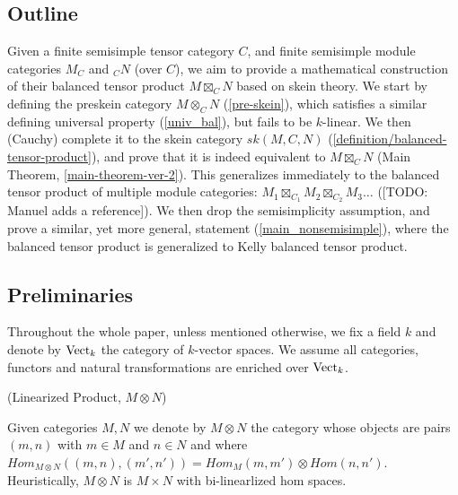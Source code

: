 
\subsection{Outline}\label{subsection/outline}



\noindent Given a finite semisimple tensor category $C$, and finite semisimple
module categories $M_C$ and $_CN$ (over $C$), we aim to provide a mathematical
construction of their balanced tensor product $M \boxtimes_C N$ based on skein
theory. We start by defining the preskein category $M \otimes_C N$
(\ref{pre-skein}), which satisfies a similar defining universal property
(\ref{univ_bal}), but fails to be $k$-linear. We then (Cauchy) complete it to
the skein category $sk(M,C,N)$ (\ref{definition/balanced-tensor-product}), and
prove that it is indeed equivalent to $M \boxtimes_C N$ (Main Theorem,
\ref{main-theorem-ver-2}). This generalizes immediately to the balanced tensor
product of multiple module categories: $M_1 \boxtimes_{C_1} M_2 \boxtimes_{C_2}
M_3 \ldots$ ([TODO: Manuel adds a reference]). We then drop the semisimplicity
assumption, and prove a similar, yet more general, statement
(\ref{main_nonsemisimple}), where the balanced tensor product is generalized
to Kelly balanced tensor product.

\subsection{Preliminaries}\label{subsection/preliminaries}

Throughout the whole paper, unless mentioned otherwise, we fix a field $k$ and
denote by $\operatorname{Vect}_k$ the category of $k$-vector spaces. We assume all
categories, functors and natural transformations are enriched over $\operatorname{Vect}_k$.

\begin{definition} \label{definition/linearized-product} (Linearized Product, $M \otimes N$)

\noindent
Given categories $M,N$ we denote by $M\otimes N$ the category whose objects
are pairs $(m,n)$ with $m\in M$ and $n\in N$ and where $Hom_{M\otimes
N}((m,n),(m',n'))=Hom_M(m,m')\otimes Hom(n,n')$. Heuristically, $M \otimes N$
is $M \times N$ with bi-linearlized hom spaces.
\end{definition}

